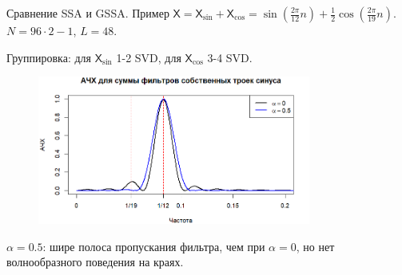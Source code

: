 \documentclass[notheorems, handout]{beamer}
\newcommand{\TS}{\mathsf{X}}
\begin{document}
	\begin{frame}{Сравнение SSA и GSSA. Пример}
		$\TS = \TS_{\sin} + \TS_{\cos} = \sin\left(\frac{2\pi}{12} n \right) + \frac{1}{2}\cos\left(\frac{2\pi}{19} n \right)$. $N = 96 \cdot 2 - 1$, $L = 48$.
		
		Группировка: для $\TS_{\sin}$ 1-2 SVD, для $\TS_{\cos}$ 3-4 SVD.

		\begin{figure}[ht]
			\centering
			\includegraphics[width=0.8\textwidth]{../Text/img/various_alphas_sin_cos.png}
			\label{fig:various_alphas_sin_cos}
		\end{figure}
		\(\alpha = 0.5\): шире полоса пропускания фильтра, чем при $\alpha = 0 $, но нет волнообразного поведения на краях. 
	\end{frame}
	
\end{document}
